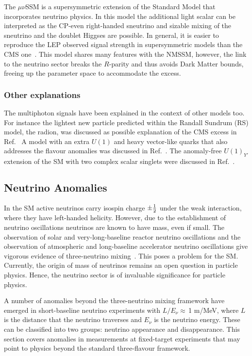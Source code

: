 \documentclass[10pt]{article}
\begin{document}
The $\mu\nu$SSM is a supersymmetric extension of the Standard Model that incorporates neutrino physics.
In this model the additional light scalar can be interpreted as the CP-even right-handed sneutrino and sizable mixing of the sneutrino and the doublet Higgses are possible.
In general, it is easier to reproduce the LEP observed signal strength in supersymmetric models than the CMS one~\cite{Biekotter:2017xmf}.
This model shares many features with the NMSSM, however, the link to the neutrino sector breaks the $R$-parity and thus avoids Dark Matter bounds, freeing up the parameter space to accommodate the excess.


\subsubsection{Other explanations}
%
The multiphoton signals have been explained in the context of other models too.
For instance the lightest new particle predicted within the Randall Sundrum (RS) model, the radion, was discussed as possible explanation of the CMS excess in Ref.~\cite{Richard:2017kot}
A model with an extra $U(1)$ and heavy vector-like quarks that also addresses the flavour anomalies was discussed in Ref.~\cite{Liu:2018xsw}. 
The anomaly-free $U(1)_{Y'}$ extension of the SM with two complex scalar singlets were discussed in Ref.~\cite{Aguilar-Saavedra:2020wrj}.



\subsection{Neutrino Anomalies}
%
\label{sec:neutrino}
In the SM active neutrinos carry isospin charge $\pm {1 \over 2}$ under the weak interaction, where they have left-handed helicity. However, due to the establishment of neutrino oscillations neutrinos are known to have mass, even if small. The observation of solar and very-long-baseline reactor neutrino oscillations and the observation
of atmospheric and long-baseline accelerator neutrino oscillations give  vigorous evidence of three-neutrino mixing~\cite{MINOS:2007ixr,KamLAND:2008dgz}. This poses a problem for the SM. Currently, the origin of mass of neutrinos remains an open question in particle physics. Hence, the neutrino sector is of invaluable significance for particle physics. 

A number of anomalies beyond the three-neutrino mixing framework have emerged in short-baseline neutrino experiments with $L/E_\nu\approx$\,1 m/MeV, where $L$ is the distance that the neutrino traverses and $E_\nu$ is the neutrino energy. These can be classified into two groups: neutrino appearance and disappearance. 
This section covers anomalies in measurements at fixed-target experiments that may point to physics beyond the  standard three-flavour framework. 
\end{document}
